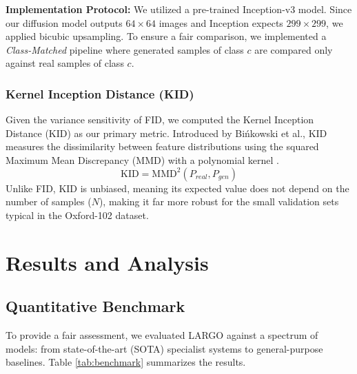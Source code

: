 \documentclass[12pt, a4paper]{article}
\begin{document}
\textbf{Implementation Protocol:} 
We utilized a pre-trained Inception-v3 model. Since our diffusion model outputs $64 \times 64$ images and Inception expects $299 \times 299$, we applied bicubic upsampling. To ensure a fair comparison, we implemented a \textit{Class-Matched} pipeline where generated samples of class $c$ are compared only against real samples of class $c$.

\subsubsection{Kernel Inception Distance (KID)}
Given the variance sensitivity of FID, we computed the Kernel Inception Distance (KID) as our primary metric. Introduced by Bińkowski et al., KID measures the dissimilarity between feature distributions using the squared Maximum Mean Discrepancy (MMD) with a polynomial kernel \cite{binkowski2018kid}.
\begin{equation}
    \text{KID} = \text{MMD}^2(P_{real}, P_{gen})
\end{equation}
Unlike FID, KID is unbiased, meaning its expected value does not depend on the number of samples ($N$), making it far more robust for the small validation sets typical in the Oxford-102 dataset.

\section{Results and Analysis}

\subsection{Quantitative Benchmark}
To provide a fair assessment, we evaluated LARGO against a spectrum of models: from state-of-the-art (SOTA) specialist systems to general-purpose baselines. Table \ref{tab:benchmark} summarizes the results.
\end{document}
